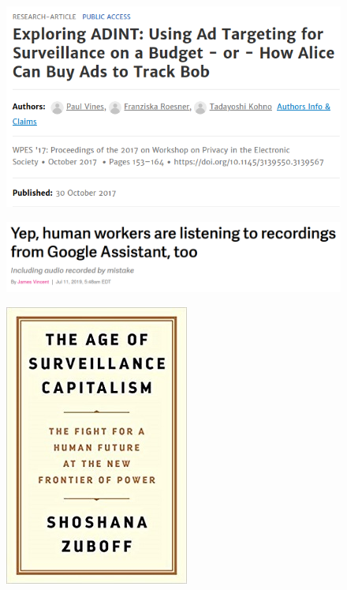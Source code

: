 \begin{frame}
  \begin{figure}
    \includegraphics[width=\columnwidth]{fig/adint.png}
  \end{figure}
\end{frame}

\begin{frame}
  \begin{figure}
    \includegraphics[width=\columnwidth]{fig/listening-assistants.png}
  \end{figure}
\end{frame}

\begin{frame}
  \begin{figure}
    \includegraphics[height=0.8\textheight]{fig/The-Age-of-Surveillance-Capitalism.jpg}
  \end{figure}
\end{frame}

